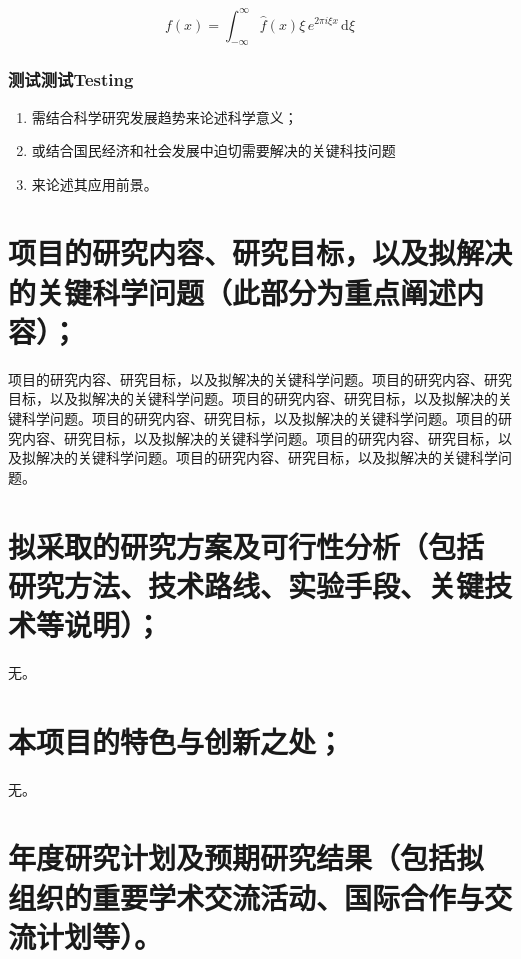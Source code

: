 \documentclass{nsfc}
\begin{document}
\begin{equation}\label{eq:1}
    f(x) = \int_{-\infty}^\infty  \hat f(x)\xi\,e^{2 \pi i \xi x}  \,\mathrm{d}\xi 
\end{equation}

\subsubsection{测试测试Testing}

\begin{enumerate}[1.]
    \item 需结合科学研究发展趋势来论述科学意义；
    \item 或结合国民经济和社会发展中迫切需要解决的关键科技问题
    \item 来论述其应用前景。
\end{enumerate}



\section{\textbf{项目的研究内容、研究目标，以及拟解决的关键科学问题}（此部分为重点阐述内容）；}

项目的研究内容、研究目标，以及拟解决的关键科学问题。项目的研究内容、研究目标，以及拟解决的关键科学问题。项目的研究内容、研究目标，以及拟解决的关键科学问题。项目的研究内容、研究目标，以及拟解决的关键科学问题。项目的研究内容、研究目标，以及拟解决的关键科学问题。项目的研究内容、研究目标，以及拟解决的关键科学问题。项目的研究内容、研究目标，以及拟解决的关键科学问题。

\section{\textbf{拟采取的研究方案及可行性分析}（包括研究方法、技术路线、实验手段、关键技术等说明）；}

无。

\section{\textbf{本项目的特色与创新之处；}}

无。

\section{\textbf{年度研究计划及预期研究结果}（包括拟组织的重要学术交流活动、国际合作与交流计划等）。}
\end{document}
